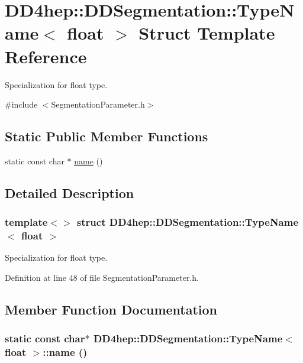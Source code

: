 \hypertarget{struct_d_d4hep_1_1_d_d_segmentation_1_1_type_name_3_01float_01_4}{
\section{DD4hep::DDSegmentation::TypeName$<$ float $>$ Struct Template Reference}
\label{struct_d_d4hep_1_1_d_d_segmentation_1_1_type_name_3_01float_01_4}
}


Specialization for float type.  


{\ttfamily \#include $<$SegmentationParameter.h$>$}\subsection*{Static Public Member Functions}
\begin{DoxyCompactItemize}
\item 
static const char $\ast$ \hyperlink{struct_d_d4hep_1_1_d_d_segmentation_1_1_type_name_3_01float_01_4_a5c6ce68f57f308f5ec658c5f6354671f}{name} ()
\end{DoxyCompactItemize}


\subsection{Detailed Description}
\subsubsection*{template$<$$>$ struct DD4hep::DDSegmentation::TypeName$<$ float $>$}

Specialization for float type. 

Definition at line 48 of file SegmentationParameter.h.

\subsection{Member Function Documentation}
\hypertarget{struct_d_d4hep_1_1_d_d_segmentation_1_1_type_name_3_01float_01_4_a5c6ce68f57f308f5ec658c5f6354671f}{
\subsubsection[{name}]{\setlength{\rightskip}{0pt plus 5cm}static const char$\ast$ {\bf DD4hep::DDSegmentation::TypeName}$<$ float $>$::name ()}}
\label{struct_d_d4hep_1_1_d_d_segmentation_1_1_type_name_3_01float_01_4_a5c6ce68f57f308f5ec658c5f6354671f}


